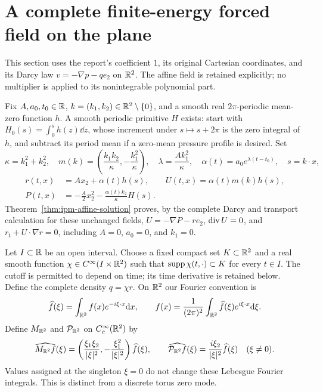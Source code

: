 \section{A complete finite-energy forced field on the plane}
This section uses the report's coefficient $1$, its original Cartesian
coordinates, and its Darcy law $v=-\nabla p-qe_2$ on $\mathbb R^2$.
The affine field is retained explicitly; no multiplier is applied to its
nonintegrable polynomial part.

Fix $A,a_0,t_0\in\mathbb R$, $k=(k_1,k_2)\in\mathbb R^2\setminus\{0\}$, and a smooth
real $2\pi$-periodic mean-zero function $h$. A smooth periodic primitive
$H$ exists: start with $H_0(s)=\int_0^s h(z)\dd z$, whose increment under
$s\mapsto s+2\pi$ is the zero integral of $h$, and subtract its period mean
if a zero-mean pressure profile is desired. Set
\[
\kappa=k_1^2+k_2^2,\quad
m(k)=\left(\frac{k_1k_2}{\kappa},-\frac{k_1^2}{\kappa}\right),\quad
\lambda=\frac{A k_1^2}{\kappa},\quad
\alpha(t)=a_0e^{\lambda(t-t_0)},\quad s=k\cdot x,
\]
\begin{equation}\label{ipmc:affine}
\begin{split}
r(t,x)&=Ax_2+\alpha(t)h(s),\qquad U(t,x)=\alpha(t)m(k)h(s),\\
P(t,x)&=-\frac A2x_2^2-\frac{\alpha(t)k_2}{\kappa}H(s).
\end{split}
\end{equation}
Theorem~\ref{thm:ipm-affine-solution} proves, by the complete
Darcy and transport calculation for these unchanged fields,
$U=-\nabla P-re_2$, $\operatorname{div} U=0$, and $r_t+U\cdot\nabla r=0$,
including $A=0$, $a_0=0$, and $k_1=0$.

Let $I\subset\mathbb R$ be an open interval. Choose a fixed compact set
$K\subset\mathbb R^2$ and a real smooth function $\chi\in C^\infty(I\times\mathbb R^2)$
such that $\operatorname{supp}\chi(t,\cdot)\subset K$ for every $t\in I$. The cutoff
is permitted to depend on time; its time derivative is retained below.
Define the complete density $q=\chi r$. On $\mathbb R^2$ our Fourier convention is
\[
\widehat f(\xi)=\int_{\mathbb R^2}f(x)e^{-i\xi\cdot x}\mathrm d x,\qquad
f(x)=\frac1{(2\pi)^2}\int_{\mathbb R^2}\widehat f(\xi)e^{i\xi\cdot x}\mathrm d\xi.
\]
Define $M_{\mathbb R^2}$ and $\mathcal P_{\mathbb R^2}$ on $C_c^\infty(\mathbb R^2)$ by
\begin{equation}\label{ipmc:plane-operators}
\widehat{M_{\mathbb R^2}f}(\xi)
=\left(\frac{\xi_1\xi_2}{|\xi|^2},-\frac{\xi_1^2}{|\xi|^2}\right)\widehat f(\xi),
\qquad
\widehat{\mathcal P_{\mathbb R^2}f}(\xi)=\frac{i\xi_2}{|\xi|^2}\widehat f(\xi)
\quad(\xi\ne0).
\end{equation}
Values assigned at the singleton $\xi=0$ do not change these Lebesgue
Fourier integrals. This is distinct from a discrete torus zero mode.

